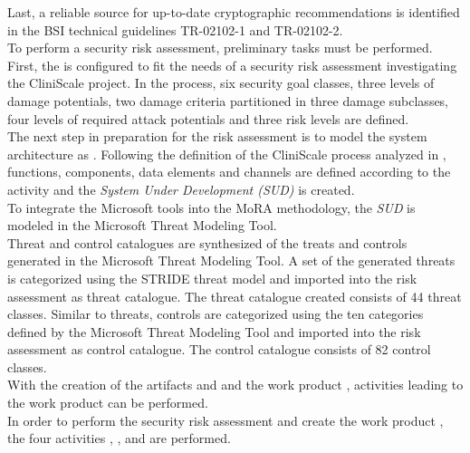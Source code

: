 Last, a reliable source for up-to-date cryptographic recommendations is identified in the BSI technical guidelines TR-02102-1 and TR-02102-2.\\
\newline
To perform a security risk assessment, preliminary tasks must be performed.\\
First, the \textit{} is configured to fit the needs of a security risk assessment investigating the CliniScale project. In the process, six security goal classes, three levels of damage potentials, two damage criteria partitioned in three damage subclasses, four levels of required attack potentials and three risk levels are defined.\\
\newline
The next step in preparation for the risk assessment is to model the system architecture as \textit{}. Following the definition of the CliniScale process analyzed in \textit{}, functions, components, data elements and channels are defined according to the \textit{} activity and the \textit{System Under Development (SUD)} is created.\\
To integrate the Microsoft tools into the MoRA methodology, the \textit{SUD} is modeled in the Microsoft Threat Modeling Tool.\\
Threat and control catalogues are synthesized of the treats and controls generated in the Microsoft Threat Modeling Tool. A set of the generated threats is categorized using the STRIDE threat model and imported into the risk assessment as threat catalogue. The threat catalogue created consists of 44 threat classes. Similar to threats, controls are categorized using the ten categories defined by the Microsoft Threat Modeling Tool and imported into the risk assessment as control catalogue. The control catalogue consists of 82 control classes.\\
With the creation of the artifacts \textit{} and \textit{} and the work product \textit{}, activities leading to the work product \textit{} can be performed.\\
\newline
In order to perform the security risk assessment and create the work product \textit{}, the four activities \textit{}, \textit{}, \textit{} and \textit{} are performed.\\
